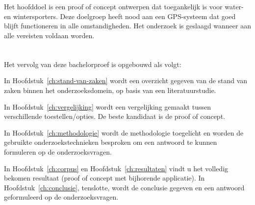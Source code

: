 \section{}
\label{sec:onderzoeksdoelstelling}
Het hoofddoel is een proof of concept ontwerpen dat toegankelijk is voor water- en wintersporters. Deze doelgroep heeft nood aan een GPS-systeem dat goed blijft functioneren in alle omstandigheden. Het onderzoek is geslaagd wanneer aan alle vereisten voldaan worden.


\section{}
\label{sec:opzet-bachelorproef}


Het vervolg van deze bachelorproef is opgebouwd als volgt:

In Hoofdstuk~\ref{ch:stand-van-zaken} wordt een overzicht gegeven van de stand van zaken binnen het onderzoeksdomein, op basis van een literatuurstudie.

In Hoofdstuk~\ref{ch:vergelijking} wordt een vergelijking gemaakt tussen verschillende toestellen/opties. De beste kandidaat is de proof of concept.

In Hoofdstuk~\ref{ch:methodologie} wordt de methodologie toegelicht en worden de gebruikte onderzoekstechnieken besproken om een antwoord te kunnen formuleren op de onderzoeksvragen.


In Hoofdstuk~\ref{ch:corpus} en Hoofdstuk~\ref{ch:resultaten} vindt u het volledig bekomen resultaat (proof of concept met bijhorende applicatie).
\newline
\newline
In Hoofdstuk~\ref{ch:conclusie}, tenslotte, wordt de conclusie gegeven en een antwoord geformuleerd op de onderzoeksvragen.